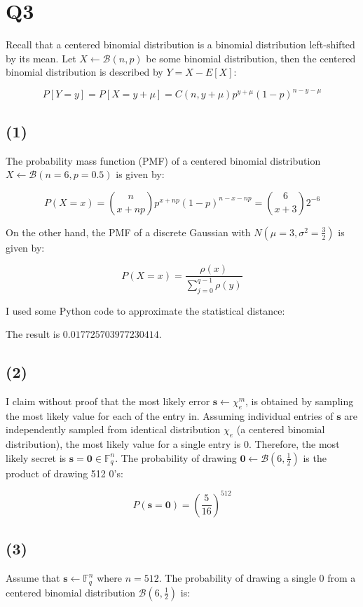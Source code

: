 \documentclass{article}
\begin{document}
\section*{Q3}
Recall that a centered binomial distribution is a binomial distribution left-shifted by its mean. Let $X \leftarrow \mathcal{B}(n, p)$ be some binomial distribution, then the centered binomial distribution is described by $Y = X - E[X]$:

$$
P[Y=y] = P[X = y + \mu] = C(n, y + \mu)p^{y + \mu}(1-p)^{n - y - \mu}
$$

\subsection*{(1)}
The probability mass function (PMF) of a centered binomial distribution $X \leftarrow \mathcal{B}(n=6, p=0.5)$ is given by:

$$
P(X=x) = {n \choose {x+np}}p^{x + np}(1-p)^{n - x - np} = {6 \choose {x+3}}2^{-6}
$$

On the other hand, the PMF of a discrete Gaussian with $N(\mu=3, \sigma^2=\frac{3}{2})$ is given by:

$$
P(X=x) = \frac{\rho(x)}{\sum_{j=0}^{q-1}\rho(y)}
$$

I used some Python code to approximate the statistical distance:



The result is $0.017725703977230414$.

\subsection*{(2)}
I claim without proof that the most likely error $\mathbf{s} \leftarrow \chi_e^m$, is obtained by sampling the most likely value for each of the entry in. Assuming individual entries of $\mathbf{s}$ are independently sampled from identical distribution $\chi_e$ (a centered binomial distribution), the most likely value for a single entry is $0$. Therefore, the most likely secret is $\mathbf{s} = \mathbf{0} \in \mathbb{F}_q^n$. The probability of drawing $\mathbf{0} \leftarrow \mathcal{B}(6, \frac{1}{2})$ is the product of drawing 512 $0$'s:

$$
P(\mathbf{s} = \mathbf{0}) = (\frac{5}{16})^{512}
$$

\subsection*{(3)}
Assume that $\mathbf{s} \leftarrow \mathbb{F}_q^n$ where $n = 512$. The probability of drawing a single $0$ from a centered binomial distribution $\mathcal{B}(6, \frac{1}{2})$ is:
\end{document}
